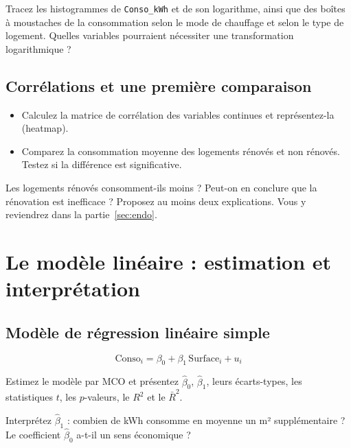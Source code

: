 \documentclass[11pt,a4paper]{article}
\newcommand{\var}[1]{\texttt{#1}}
\begin{document}
\begin{afaire}
Tracez les histogrammes de \var{Conso\_kWh} et de son logarithme, ainsi que des boîtes à moustaches de la consommation selon le mode de chauffage et selon le type de logement. Quelles variables pourraient nécessiter une transformation logarithmique ?
\end{afaire}

\subsection{Corrélations et une première comparaison}
\begin{itemize}
  \item Calculez la matrice de corrélation des variables continues et représentez-la (heatmap).
  \item Comparez la consommation moyenne des logements rénovés et non rénovés. Testez si la différence est significative.
\end{itemize}

\begin{question}
Les logements rénovés consomment-ils moins ? Peut-on en conclure que la rénovation est inefficace ? Proposez au moins deux explications. Vous y reviendrez dans la partie~\ref{sec:endo}.
\end{question}

\section{Le modèle linéaire : estimation et interprétation}

\subsection{Modèle de régression linéaire simple}
\begin{modelbox}
\begin{equation}
\text{Conso}_i = \beta_0 + \beta_1\,\text{Surface}_i + u_i
\end{equation}
\end{modelbox}
Estimez le modèle par MCO et présentez $\hat\beta_0$, $\hat\beta_1$, leurs écarts-types, les statistiques $t$, les $p$-valeurs, le $R^2$ et le $\bar R^2$.

\begin{question}
Interprétez $\hat\beta_1$ : combien de kWh consomme en moyenne un m² supplémentaire ? Le coefficient $\hat\beta_0$ a-t-il un sens économique ?
\end{question}
\end{document}
